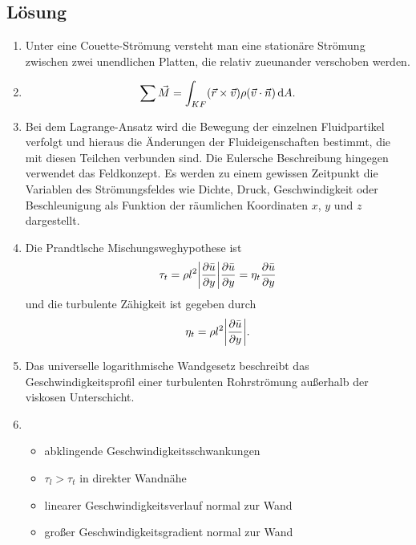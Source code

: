 \documentclass{exercise}
\begin{document}
    \subsection*{Lösung}
    \begin{enumerate}
        \item Unter eine Couette-Strömung versteht man eine stationäre Strömung zwischen zwei unendlichen Platten, die relativ zueunander verschoben werden.
        \item
        \[
            \sum\vec{M} = \int_{KF}\parentheses*{\vec{r} \times \vec{v}}\rho\parentheses*{\vec{v} \cdot \vec{n}}\d A.
        \]
        \item Bei dem Lagrange-Ansatz wird die Bewegung der einzelnen Fluidpartikel verfolgt und hieraus die Änderungen der Fluideigenschaften bestimmt, die mit diesen Teilchen verbunden sind.
        Die Eulersche Beschreibung hingegen verwendet das Feldkonzept.
        Es werden zu einem gewissen Zeitpunkt die Variablen des Strömungsfeldes wie Dichte, Druck, Geschwindigkeit oder Beschleunigung als Funktion der räumlichen Koordinaten \(x\), \(y\) und \(z\) dargestellt.
        \item Die Prandtlsche Mischungsweghypothese ist
        \[
            \tau_t = \rho l^2 \absolute*{\frac{\partial\bar{u}}{\partial y}}\frac{\partial\bar{u}}{\partial y} = \eta_t \frac{\partial\bar{u}}{\partial y}
        \]
        und die turbulente Zähigkeit ist gegeben durch
        \[
            \eta_t = \rho l^2 \absolute*{\frac{\partial\bar{u}}{\partial y}}.
        \]
        \item Das universelle logarithmische Wandgesetz beschreibt das Geschwindigkeitsprofil einer turbulenten Rohrströmung außerhalb der viskosen Unterschicht.
        \item
        \begin{itemize}
            \item abklingende Geschwindigkeitsschwankungen
            \item \(\tau_l > \tau_t\) in direkter Wandnähe
            \item linearer Geschwindigkeitsverlauf normal zur Wand
            \item großer Geschwindigkeitsgradient normal zur Wand
        \end{itemize}
    \end{enumerate}
\end{document}
